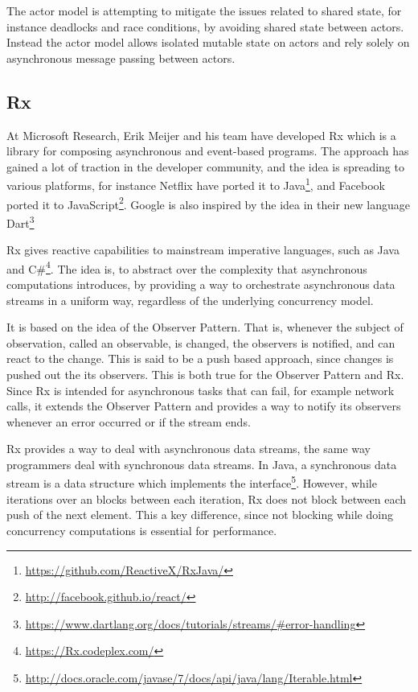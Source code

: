 The actor model is attempting to mitigate the issues related to shared state, for instance deadlocks and race conditions, by avoiding shared state between actors\citep[Chap. 32]{odersky2011programming}. Instead the actor model allows isolated mutable state on actors and rely solely on asynchronous message passing between actors.

\subsection{\acl{Rx}}
At Microsoft Research, Erik Meijer and his team have developed \ac{Rx} which is a library for composing asynchronous and event-based programs. The approach has gained a lot of traction in the developer community, and the idea is spreading to various platforms, for instance Netflix have ported it to Java\footnote{\url{https://github.com/ReactiveX/RxJava/}}, and Facebook ported it to JavaScript\footnote{\url{http://facebook.github.io/react/}}. Google is also inspired by the idea in their new language Dart\footnote{\url{https://www.dartlang.org/docs/tutorials/streams/\#error-handling}}

\ac{Rx} gives reactive capabilities to mainstream imperative languages, such as Java and C\#\footnote{\url{https://Rx.codeplex.com/}}. The idea is, to abstract over the complexity that asynchronous computations introduces, by providing a way to orchestrate asynchronous data streams in a uniform way, regardless of the underlying concurrency model.

It is based on the idea of the Observer Pattern\cite{gamma1994design}. That is, whenever the subject of observation, called an observable, is changed, the observers is notified, and can react to the change. This is said to be a push based approach, since changes is pushed out the its observers. This is both true for the Observer Pattern and \ac{Rx}. Since \ac{Rx} is intended for asynchronous tasks that can fail, for example network calls, it extends the Observer Pattern and provides a way to notify its observers whenever an error occurred or if the stream ends.

\ac{Rx} provides a way to deal with asynchronous data streams, the same way programmers deal with synchronous data streams. In Java, a synchronous data stream is a data structure which implements the  interface\footnote{\url{http://docs.oracle.com/javase/7/docs/api/java/lang/Iterable.html}}. However, while iterations over an  blocks between each iteration, \ac{Rx} does not block between each push of the next element. This a key difference, since not blocking while doing concurrency computations is essential for performance.

